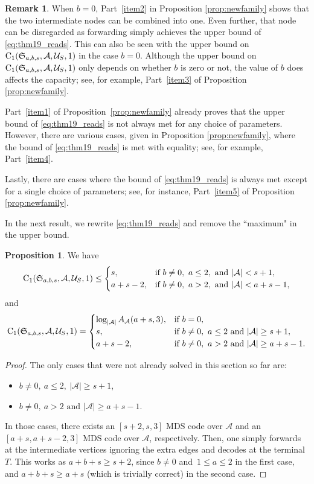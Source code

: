 \documentclass[11pt,a4paper]{article}
\theoremstyle{definition}
\newtheorem{proposition}[theorem]{Proposition}
\newtheorem{remark}[theorem]{Remark}
\newcommand{\mA}{\mathcal{A}}
\newcommand{\mU}{\mathcal{U}}
\newcommand{\CC}{\textnormal{C}}
\begin{document}
\begin{remark}
When $b=0$, Part~\ref{item2} in Proposition \ref{prop:newfamily} shows that the two intermediate nodes can be combined into one. Even further, that node can be disregarded as forwarding simply achieves the upper bound of \eqref{eq:thm19_reads}. This can also be seen with the upper bound on~$\CC_1(\mathfrak{S}_{a,b,s},\mA,\mU_S,1)$ in the case $b=0$. Although the upper bound on~$\CC_1(\mathfrak{S}_{a,b,s},\mA,\mU_S,1)$ only depends on whether $b$ is zero or not, the value of $b$ does affects the capacity; see, for example, Part~\ref{item3} of Proposition \ref{prop:newfamily}. 

Part~\ref{item1} of Proposition~\ref{prop:newfamily} already proves that the upper bound of \eqref{eq:thm19_reads} is not always met for any choice of parameters. However, there are various cases, given in Proposition \ref{prop:newfamily}, where the bound of \eqref{eq:thm19_reads} is met with equality; see, for example, Part~\ref{item4}. 

Lastly, there are cases where the bound of \eqref{eq:thm19_reads} is always met except for a single choice of parameters; see, for instance, Part~\ref{item5} of Proposition \ref{prop:newfamily}.
\end{remark}

In the next result, we rewrite \eqref{eq:thm19_reads} and remove the ``maximum" in the upper bound.
\begin{proposition}
\label{prop:updateupper}
We have $$\CC_1(\mathfrak{S}_{a,b,s},\mA,\mU_S,1) \le
\begin{cases}      
      s,  & \text{if } b\neq 0,\  a\le 2, \mbox{ and }\lvert \mA \rvert < s+1, \\
      a+s-2,  & \text{if } b\neq 0,\  a > 2, \mbox{ and }\lvert \mA \rvert < a+s-1,
\end{cases}$$ and
$$\CC_1(\mathfrak{S}_{a,b,s},\mA,\mU_S,1) =
\begin{cases}
      \log_{|\mA|}A_{\mA}(a+s,3),  & \text{if } b= 0, \\
      s,  & \text{if } b\neq 0,\  a\le 2 \mbox{ and }\lvert \mA \rvert \ge s+1, \\
      a+s-2,  & \text{if } b\neq 0,\  a > 2 \mbox{ and }\lvert \mA \rvert \ge a+s-1.
\end{cases}$$
\end{proposition}
\begin{proof}
The only cases that were not already solved in this section so far are:
\begin{itemize}
    \item $b\neq 0,\  a \le 2,\ |\mA| \ge s+1$,
    \item $b\neq 0,\  a > 2 \mbox{ and }|\mA| \ge a+s-1$.
\end{itemize}
In those cases, there exists an $[s+2,s,3]$ MDS code over $\mA$ and an $[a+s,a+s-2,3]$ MDS code over $\mA$, respectively. Then, one simply forwards at the intermediate vertices ignoring the extra edges and decodes at the terminal $T$. This works as $a+b+s \ge s+2$, since $b \neq 0$ and~$1 \le a \le 2$ in the first case, and $a+b+s \ge a+s$ (which is trivially correct) in the second case.
\end{proof}
\end{document}

